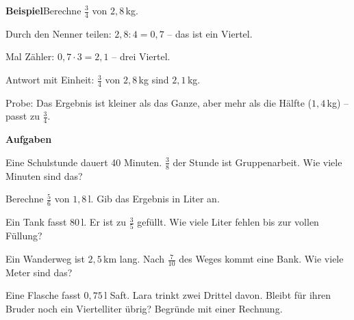 \documentclass[11pt]{article}
\newcommand{\aufg}[3]{\par\noindent\makebox[0pt][r]{#3}\begin{minipage}[t]{\linewidth}#1\end{minipage}\par}
\newcommand{\nr}[1]{\makebox[7mm][l]{\textbf{#1}}}
\newlength{\kr}
\begin{document}
\noindent\textbf{Beispiel}\quad Berechne $\frac{3}{4}$ von $2{,}8$\,kg.\par\smallskip
\noindent\par\noindent{}Durch den Nenner teilen: $2{,}8 : 4 = 0{,}7$ – das ist ein Viertel.\par\smallskip\par\noindent{}Mal Zähler: $0{,}7 \cdot 3 = 2{,}1$ – drei Viertel.\par\smallskip\par\noindent{}Antwort mit Einheit: $\frac{3}{4}$ von $2{,}8$\,kg sind $2{,}1$\,kg.\par\smallskip\par\noindent{}Probe: Das Ergebnis ist kleiner als das Ganze, aber mehr als die Hälfte ($1{,}4$\,kg) – passt zu $\frac{3}{4}$.\par\smallskip\par\medskip
\noindent\textbf{Aufgaben}\par\smallskip
\aufg{\nr{1.}Eine Schulstunde dauert 40 Minuten. $\frac{3}{8}$ der Stunde ist Gruppenarbeit. Wie viele Minuten sind das?}{}{}
\medskip
\aufg{\nr{2.}Berechne $\frac{5}{6}$ von $1{,}8$\,l. Gib das Ergebnis in Liter an.}{}{}
\medskip
\aufg{\nr{3.}Ein Tank fasst 80\,l. Er ist zu $\frac{3}{5}$ gefüllt. Wie viele Liter fehlen bis zur vollen Füllung?}{}{}
\medskip
\aufg{\nr{4.}Ein Wanderweg ist $2{,}5$\,km lang. Nach $\frac{7}{10}$ des Weges kommt eine Bank. Wie viele Meter sind das?}{}{}
\medskip
\aufg{\nr{5.}Eine Flasche fasst $0{,}75$\,l Saft. Lara trinkt zwei Drittel davon. Bleibt für ihren Bruder noch ein Viertelliter übrig? Begründe mit einer Rechnung.}{}{{\scriptsize\color{mbgrau}Ziel\hspace{2mm}}}
\medskip
\par\vspace{3mm}\setlength{\kr}{\dimexpr\pagegoal-\pagetotal-10mm\relax}%
\ifdim\kr>12mm\noindent{\scriptsize\color{mbgrau}Platz zum Rechnen}\par\nointerlineskip\vspace{1mm}\noindent
\begin{tikzpicture}\clip (0,0) rectangle ({\linewidth-0.5mm},\kr);\draw[black!16,line width=0.3pt,step=5mm] (0,0) grid (\linewidth,\kr);\end{tikzpicture}\fi\par
\end{document}
